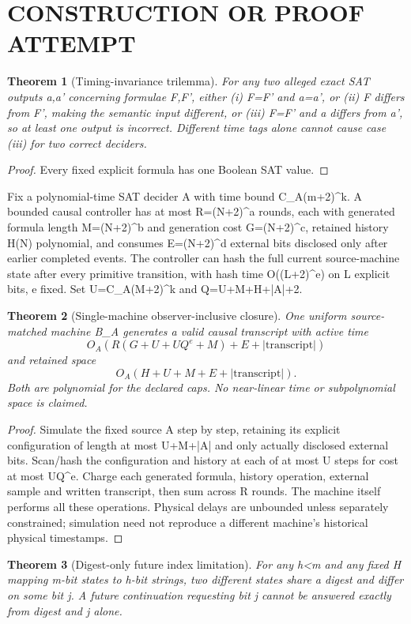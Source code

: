 \documentclass{article}
\newtheorem{theorem}{Theorem}
\begin{document}
\section{CONSTRUCTION OR PROOF ATTEMPT}
\begin{theorem}[Timing-invariance trilemma]
For any two alleged exact SAT outputs a,a' concerning formulae F,F', either (i) F=F' and a=a', or (ii) F differs from F', making the semantic input different, or (iii) F=F' and a differs from a', so at least one output is incorrect. Different time tags alone cannot cause case (iii) for two correct deciders.
\end{theorem}
\begin{proof}Every fixed explicit formula has one Boolean SAT value.\end{proof}
Fix a polynomial-time SAT decider A with time bound C_A(m+2)^k. A bounded causal controller has at most R=(N+2)^a rounds, each with generated formula length M=(N+2)^b and generation cost G=(N+2)^c, retained history H(N) polynomial, and consumes E=(N+2)^d external bits disclosed only after earlier completed events. The controller can hash the full current source-machine state after every primitive transition, with hash time O((L+2)^e) on L explicit bits, e fixed. Set U=C_A(M+2)^k and Q=U+M+H+|A|+2.
\begin{theorem}[Single-machine observer-inclusive closure]
One uniform source-matched machine B_A generates a valid causal transcript with active time
\[
O_A\left(R(G+U+UQ^e+M)+E+|\mathrm{transcript}|\right)
\]
and retained space
\[
O_A(H+U+M+E+|\mathrm{transcript}|).
\]
Both are polynomial for the declared caps. No near-linear time or subpolynomial space is claimed.
\end{theorem}
\begin{proof}Simulate the fixed source A step by step, retaining its explicit configuration of length at most U+M+|A| and only actually disclosed external bits. Scan/hash the configuration and history at each of at most U steps for cost at most UQ^e. Charge each generated formula, history operation, external sample and written transcript, then sum across R rounds. The machine itself performs all these operations. Physical delays are unbounded unless separately constrained; simulation need not reproduce a different machine's historical physical timestamps.\end{proof}
\begin{theorem}[Digest-only future index limitation]
For any h<m and any fixed H mapping m-bit states to h-bit strings, two different states share a digest and differ on some bit j. A future continuation requesting bit j cannot be answered exactly from digest and j alone.
\end{theorem}
\end{document}
